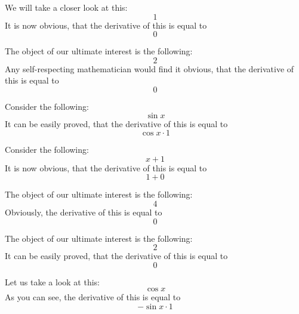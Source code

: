 \documentclass{article}
\begin{document}
We will take a closer look at this:
\begin{equation}
1 
\end{equation}
It is now obvious, that the derivative of this is equal to
\begin{equation}
0 
\end{equation}

The object of our ultimate interest is the following:
\begin{equation}
2 
\end{equation}
Any self-respecting mathematician would find it obvious, that the derivative of this is equal to
\begin{equation}
0 
\end{equation}

Consider the following:
\begin{equation}
\sin x 
\end{equation}
It can be easily proved, that the derivative of this is equal to
\begin{equation}
\cos x \cdot 1 
\end{equation}

Consider the following:
\begin{equation}
x + 1 
\end{equation}
It is now obvious, that the derivative of this is equal to
\begin{equation}
1 + 0 
\end{equation}

The object of our ultimate interest is the following:
\begin{equation}
4 
\end{equation}
Obviously, the derivative of this is equal to
\begin{equation}
0 
\end{equation}

The object of our ultimate interest is the following:
\begin{equation}
2 
\end{equation}
It can be easily proved, that the derivative of this is equal to
\begin{equation}
0 
\end{equation}

Let us take a look at this:
\begin{equation}
\cos x 
\end{equation}
As you can see, the derivative of this is equal to
\begin{equation}
-\sin x \cdot 1 
\end{equation}
\end{document}
